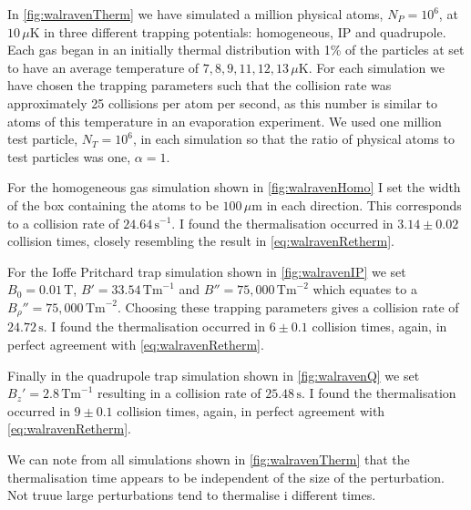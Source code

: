 In \autoref{fig:walravenTherm} we have simulated a million physical atoms, $N_P=10^6$, at $10\,\mu \mathrm{K}$ in three different trapping potentials: homogeneous, IP and quadrupole. 
Each gas began in an initially thermal distribution with 1\% of the particles at set to have an average temperature of $7,8,9,11,12,13\,\mu\mathrm{K}$.
For each simulation we have chosen the trapping parameters such that the collision rate was approximately 25 collisions per atom per second, as this number is similar to atoms of this temperature in an evaporation experiment.
We used one million test particle, $N_T=10^6$, in each simulation so that the ratio of physical atoms to test particles was one, $\alpha=1$.

For the homogeneous gas simulation shown in \autoref{fig:walravenHomo} I set the width of the box containing the atoms to be $100\,\mu \mathrm{m}$ in each direction. 
This corresponds to a collision rate of $24.64\,\mathrm{s}^{-1}$.
I found the thermalisation occurred in $3.14\pm 0.02$ collision times, closely resembling the result in \autoref{eq:walravenRetherm}.

For the Ioffe Pritchard trap simulation shown in \autoref{fig:walravenIP} we set $B_0=0.01\,\mathrm{T}$, $B'=33.54\,\mathrm{Tm}^{-1}$ and $B''=75,000\,\mathrm{Tm}^{-2}$ which equates to a ${B_{\rho}}''=75,000\,\mathrm{Tm}^{-2}$. 
Choosing these trapping parameters gives a collision rate of $24.72\,\mathrm{s}$.
I found the thermalisation occurred in $6\pm 0.1$ collision times, again, in perfect agreement with \autoref{eq:walravenRetherm}.

Finally in the quadrupole trap simulation shown in \autoref{fig:walravenQ} we set $B_z'=2.8\,\mathrm{Tm}^{-1}$ resulting in a collision rate of $25.48\,\mathrm{s}$.
I found the thermalisation occurred in $9\pm 0.1$ collision times, again, in perfect agreement with \autoref{eq:walravenRetherm}.

We can note from all simulations shown in \autoref{fig:walravenTherm} that the thermalisation time appears to be independent of the size of the perturbation. 
Not truue large perturbations tend to thermalise i different times.

